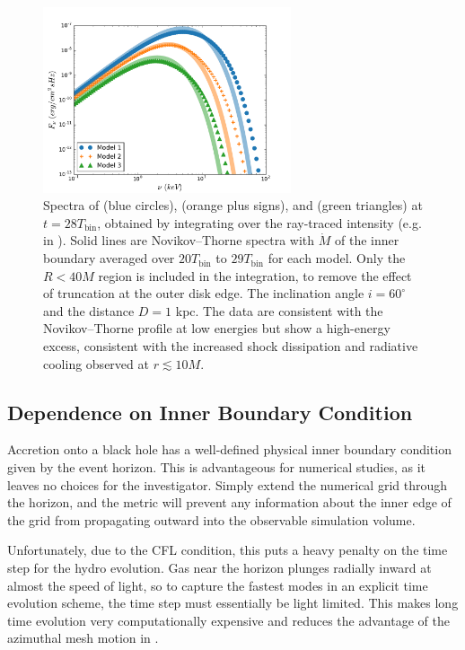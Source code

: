 \begin{figure}
	\begin{center}
	\includegraphics[width=0.65\textwidth]{figures/minidisk/q011_spec_all.pdf}
	\end{center}
	\caption{ Spectra of  (blue circles),  (orange plus signs), and  (green triangles) at $t = 28 T_\text{bin}$, obtained by integrating over the ray-traced intensity (e.g. in ).  Solid lines are Novikov--Thorne spectra with $\dot{M}$ of the inner boundary averaged over $20 T_\text{bin}$ to $29 T_\text{bin}$ for each model.  Only the $R<40M$ region is included in the integration, to remove the effect of truncation at the outer disk edge.  The inclination angle $i=60^\circ$ and the distance $D=1$ kpc.  The data are consistent with the Novikov--Thorne profile at low energies but show a high-energy excess, consistent with the increased shock dissipation and radiative cooling observed at $r\lesssim 10M$.}
\end{figure}

\subsection{Dependence on Inner Boundary Condition}

Accretion onto a black hole has a well-defined physical inner boundary condition given by the event horizon.  This is advantageous for numerical studies, as it leaves no choices for the investigator. Simply extend the numerical grid through the horizon, and the metric will prevent any information about the inner edge of the grid from propagating outward into the observable simulation volume.  

Unfortunately, due to the CFL condition, this puts a heavy penalty on the time step for the hydro evolution.  Gas near the horizon plunges radially inward at almost the speed of light, so to capture the fastest modes in an explicit time evolution scheme, the time step must essentially be light limited. This makes long time evolution very computationally expensive and reduces the advantage of the azimuthal mesh motion in \Disco{}.

